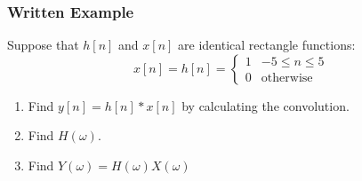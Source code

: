 \documentclass{beamer}
\begin{document}
\begin{frame}
  \frametitle{Written Example}

  Suppose that $h[n]$ and $x[n]$ are identical rectangle functions:
  \[
  x[n] = h[n] = \begin{cases}
    1 & -5 \le n\le 5\\
    0 & \mbox{otherwise}
  \end{cases}
  \]
  \begin{enumerate}
  \item Find $y[n]=h[n]\ast x[n]$ by calculating the convolution.
  \item Find $H(\omega)$.
  \item Find $Y(\omega)=H(\omega)X(\omega)$
  \end{enumerate}
\end{frame}
\end{document}
